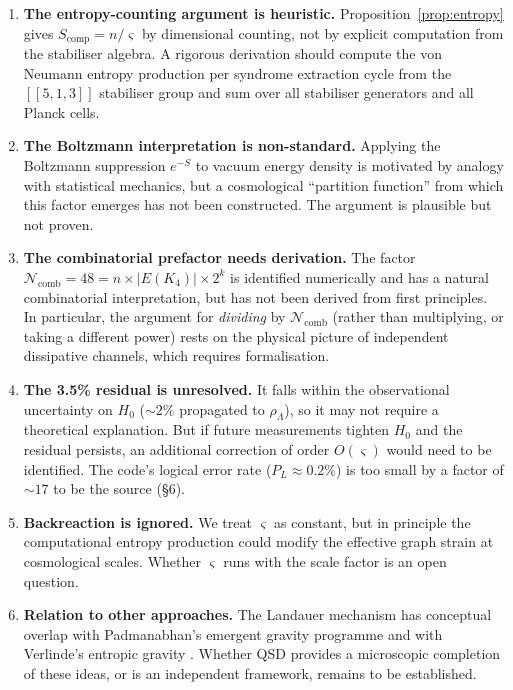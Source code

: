 \documentclass[11pt,a4paper]{article}
\theoremstyle{definition}
\newcommand{\gs}{\varsigma}                %
\newcommand{\rhoL}{\rho_{\Lambda}}
\newcommand{\Ncomb}{\mathcal{N}_{\text{comb}}}
\begin{document}
\begin{enumerate}
    \item \textbf{The entropy-counting argument is heuristic.} Proposition~\ref{prop:entropy} gives $S_{\text{comp}} = n/\gs$ by dimensional counting, not by explicit computation from the stabiliser algebra. A rigorous derivation should compute the von Neumann entropy production per syndrome extraction cycle from the $[[5,1,3]]$ stabiliser group and sum over all stabiliser generators and all Planck cells.

    \item \textbf{The Boltzmann interpretation is non-standard.} Applying the Boltzmann suppression $e^{-S}$ to vacuum energy density is motivated by analogy with statistical mechanics, but a cosmological ``partition function'' from which this factor emerges has not been constructed. The argument is plausible but not proven.

    \item \textbf{The combinatorial prefactor needs derivation.} The factor $\Ncomb = 48 = n \times |E(K_4)| \times 2^k$ is identified numerically and has a natural combinatorial interpretation, but has not been derived from first principles. In particular, the argument for \emph{dividing} by $\Ncomb$ (rather than multiplying, or taking a different power) rests on the physical picture of independent dissipative channels, which requires formalisation.

    \item \textbf{The 3.5\% residual is unresolved.} It falls within the observational uncertainty on $H_0$ ($\sim\!2\%$ propagated to $\rhoL$), so it may not require a theoretical explanation. But if future measurements tighten $H_0$ and the residual persists, an additional correction of order $O(\gs)$ would need to be identified. The code's logical error rate ($P_L \approx 0.2\%$) is too small by a factor of $\sim\!17$ to be the source (\S6).

    \item \textbf{Backreaction is ignored.} We treat $\gs$ as constant, but in principle the computational entropy production could modify the effective graph strain at cosmological scales. Whether $\gs$ runs with the scale factor is an open question.

    \item \textbf{Relation to other approaches.} The Landauer mechanism has conceptual overlap with Padmanabhan's emergent gravity programme \cite{Padmanabhan2010} and with Verlinde's entropic gravity \cite{Verlinde2011}. Whether QSD provides a microscopic completion of these ideas, or is an independent framework, remains to be established.
\end{enumerate}
\end{document}
